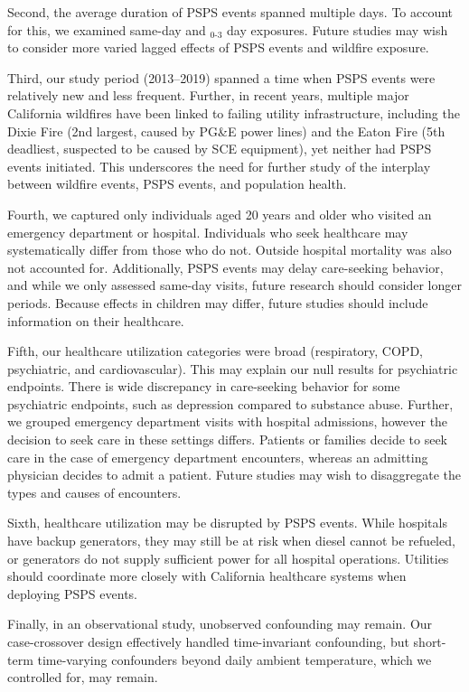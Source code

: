 \documentclass[../main.tex]{subfiles}
\begin{document}
Second, the average duration of PSPS events spanned multiple days. To account for this, we examined same-day and $_{0\text{-}3}$ day exposures. Future studies may wish to consider more varied lagged effects of PSPS events and wildfire \PM exposure. 

Third, our study period (2013--2019) spanned a time when PSPS events were relatively new and less frequent. Further, in recent years, multiple major California wildfires have been linked to failing utility infrastructure, including the Dixie Fire (2nd largest, caused by PG\&E power lines) and the Eaton Fire (5th deadliest, suspected to be caused by SCE equipment), yet neither had PSPS events initiated. This underscores the need for further study of the interplay between wildfire events, PSPS events, and population health. 

Fourth, we captured only individuals aged 20 years and older who visited an emergency department or hospital. Individuals who seek healthcare may systematically differ from those who do not. Outside hospital mortality was also not accounted for. Additionally, PSPS events may delay care-seeking behavior, and while we only assessed same-day visits, future research should consider longer periods. Because effects in children may differ, future studies should include information on their healthcare. 

Fifth, our healthcare utilization categories were broad (respiratory, COPD, psychiatric, and cardiovascular). This may explain our null results for psychiatric endpoints. There is wide discrepancy in care-seeking behavior for some psychiatric endpoints, such as depression compared to substance abuse. Further, we grouped emergency department visits with hospital admissions, however the decision to seek care in these settings differs. Patients or families decide to seek care in the case of emergency department encounters, whereas an admitting physician decides to admit a patient. Future studies may wish to disaggregate the types and causes of encounters.

Sixth, healthcare utilization may be disrupted by PSPS events. While hospitals have backup generators, they may still be at risk when diesel cannot be refueled, or generators do not supply sufficient power for all hospital operations. Utilities should coordinate more closely with California healthcare systems when deploying PSPS events.\citep{CHA2019psps}

Finally, in an observational study, unobserved confounding may remain. Our case-crossover design effectively handled time-invariant confounding, but short-term time-varying confounders beyond daily ambient temperature, which we controlled for, may remain. 
\end{document}

